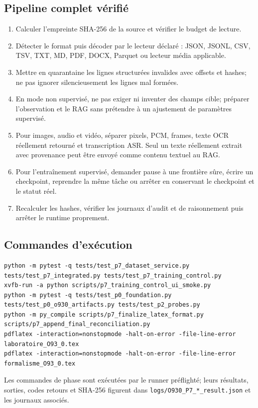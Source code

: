 \documentclass[11pt,a4paper]{report}
\begin{document}
\subsection{Pipeline complet vérifié}
\begin{enumerate}
\item Calculer l'empreinte SHA-256 de la source et vérifier le budget de lecture.
\item Détecter le format puis décoder par le lecteur déclaré : JSON, JSONL, CSV, TSV, TXT, MD, PDF, DOCX, Parquet ou lecteur média applicable.
\item Mettre en quarantaine les lignes structurées invalides avec offsets et hashes; ne pas ignorer silencieusement les lignes mal formées.
\item En mode non supervisé, ne pas exiger ni inventer des champs cible; préparer l'observation et le RAG sans prétendre à un ajustement de paramètres supervisé.
\item Pour images, audio et vidéo, séparer pixels, PCM, frames, texte OCR réellement retourné et transcription ASR. Seul un texte réellement extrait avec provenance peut être envoyé comme contenu textuel au RAG.
\item Pour l'entraînement supervisé, demander pause à une frontière sûre, écrire un checkpoint, reprendre la même tâche ou arrêter en conservant le checkpoint et le statut réel.
\item Recalculer les hashes, vérifier les journaux d'audit et de raisonnement puis arrêter le runtime proprement.
\end{enumerate}

\subsection{Commandes d'exécution}
\begin{lstlisting}
python -m pytest -q tests/test_p7_dataset_service.py tests/test_p7_integrated.py tests/test_p7_training_control.py
xvfb-run -a python scripts/p7_training_control_ui_smoke.py
python -m pytest -q tests/test_p0_foundation.py tests/test_p0_o930_artifacts.py tests/test_p2_probes.py
python -m py_compile scripts/p7_finalize_latex_format.py scripts/p7_append_final_reconciliation.py
pdflatex -interaction=nonstopmode -halt-on-error -file-line-error laboratoire_O93_0.tex
pdflatex -interaction=nonstopmode -halt-on-error -file-line-error formalisme_O93_0.tex
\end{lstlisting}
Les commandes de phase sont exécutées par le runner préflighté; leurs résultats, sorties, codes retours et SHA-256 figurent dans \texttt{logs/O930\_P7\_*\_result.json} et les journaux associés.
\end{document}
